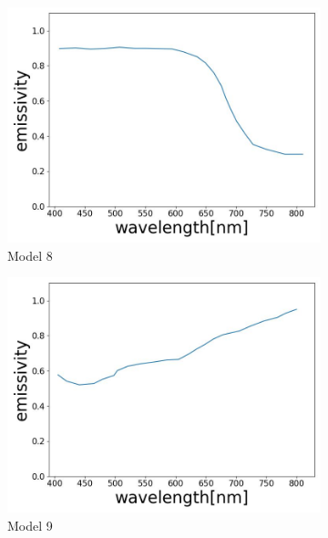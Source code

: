 \begin{figure}[htbp]
    \begin{subfigure}{0.3\linewidth}
      \centering
      \includegraphics[width=\linewidth]{figures/emissivity_32.jpg}
      \caption{Model 8}
      \label{fig: emi_32}
    \end{subfigure}
    \hfill
    \begin{subfigure}{0.3\linewidth}
      \centering
      \includegraphics[width=\linewidth]{figures/emissivity_33.jpg}
      \caption{Model 9}
      \label{fig: emi_33}
    \end{subfigure}
    \hfill
    \begin{subfigure}{0.3\linewidth}
      \centering

\end{subfigure}
\end{figure}
